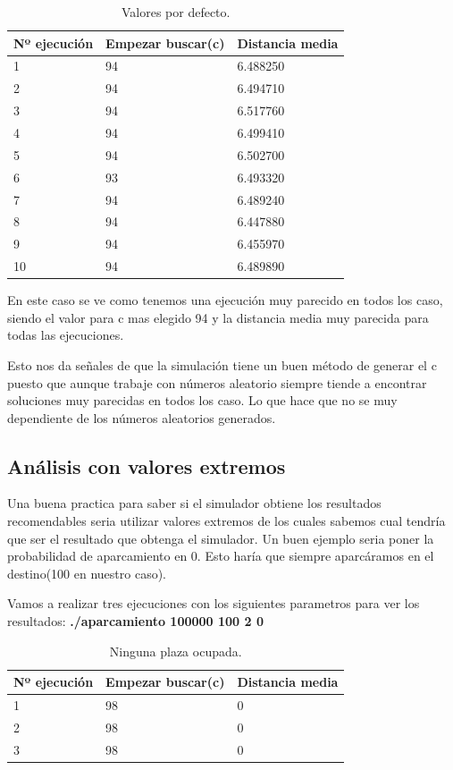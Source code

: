 \documentclass[]{article}
\begin{document}
 \begin{table}[htbp]
 	\begin{center}
 		\begin{tabular}{|l|l|l|}
 			\hline
 			Nº ejecución & Empezar buscar(c) & Distancia media \\
 			\hline \hline
 			1 & 94&6.488250
 			 \\ \hline
 			2 & 94&6.494710
 			 \\ \hline
 			3 & 94&6.517760
 			 \\ \hline
 			4 & 94&6.499410 \\ \hline
 			5 & 94&6.502700 \\ \hline
 			6 & 93&6.493320 \\ \hline
 			7 & 94&6.489240 \\ \hline
 			8 &  94&6.447880\\ \hline
 			9 & 94&6.455970 \\ \hline
 			10 & 94&6.489890 \\ \hline
 		\end{tabular}
 		\caption{Valores por defecto.}
 		\label{tabla:sencilla}
 	\end{center}
\end{table}
 En este caso se ve como tenemos una ejecución muy parecido en todos los caso, siendo el valor para c mas elegido 94 y la distancia media muy parecida para todas las ejecuciones.
 
 Esto nos da señales de que la simulación tiene un buen método de generar el c puesto que aunque trabaje con números aleatorio siempre tiende a encontrar soluciones muy parecidas en todos los caso. Lo que hace que no se muy dependiente de los números aleatorios generados.
 
 \subsection{Análisis con valores extremos}
 Una buena practica para saber si el simulador obtiene los resultados recomendables seria utilizar valores extremos de los cuales sabemos cual tendría que ser el resultado que obtenga el simulador. Un buen ejemplo seria poner la probabilidad de aparcamiento en 0. Esto haría que siempre aparcáramos en el destino(100 en nuestro caso).
 
 
 Vamos a realizar tres ejecuciones con los siguientes parametros para ver los resultados:
 \textbf{./aparcamiento 100000 100 2 0 }
 
 \begin{table}[htbp]
 	\begin{center}
 		\begin{tabular}{|l|l|l|}
 			\hline
 			Nº ejecución & Empezar buscar(c) & Distancia media \\
 			\hline \hline
 			1 & 98&0
 			\\ \hline
 			2 & 98&0
 			\\ \hline
 			3 & 98&0
 			\\ \hline
 		\end{tabular}
 		\caption{Ninguna plaza ocupada.}
 		\label{tabla:sencilla}
 	\end{center}
\end{table}
\end{document}
